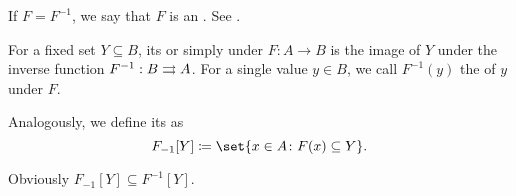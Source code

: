 \begin{definition}
\begin{thmenum}[resume=def:multi_valued_function]
     If \( F = F^{-1} \), we say that \( F \) is an . See .

     For a fixed set \( Y \subseteq B \), its  or simply  under \( F: A \to B \) is the image of \( Y \) under the inverse function \( F^{-1}: B \rightrightarrows A \). For a single value \( y \in B \), we call \( F^{-1}(y) \) the  of \( y \) under \( F \).

     Analogously, we define its  as
    \begin{equation*}
      F_{-1}[Y] \coloneqq \set{ x \in A \colon F(x) \subseteq Y }.
    \end{equation*}

    Obviously \( F_{-1}[Y] \subseteq F^{-1}[Y] \).
  \end{thmenum}
\end{definition}

